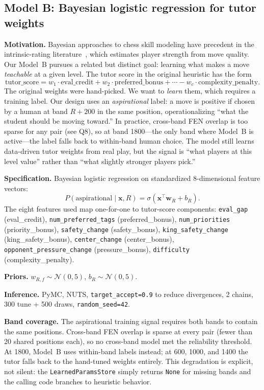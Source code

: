 \documentclass[11pt]{article}
\begin{document}
\subsection{Model B: Bayesian logistic regression for tutor weights}
\textbf{Motivation.} Bayesian approaches to chess skill modeling have precedent in the intrinsic-rating literature~\cite{regan2011intrinsic}, which estimates player strength from move quality. Our Model~B pursues a related but distinct goal: learning what makes a move \emph{teachable} at a given level. The tutor score in the original heuristic has the form
\[
\text{tutor\_score} = w_1 \cdot \text{eval\_credit} + w_2 \cdot \text{preferred\_bonus} + \cdots - w_c \cdot \text{complexity\_penalty}.
\]
The original weights were hand-picked. We want to \emph{learn} them, which requires a training label. Our design uses an \emph{aspirational} label: a move is positive if chosen by a human at band $R{+}200$ in the same position, operationalizing ``what the student should be moving toward.'' In practice, cross-band FEN overlap is too sparse for any pair (see Q8), so at band 1800---the only band where Model~B is active---the label falls back to within-band human choice. The model still learns data-driven tutor weights from real play, but the signal is ``what players at this level value'' rather than ``what slightly stronger players pick.''

\textbf{Specification.} Bayesian logistic regression on standardized 8-dimensional feature vectors:
\[
P(\text{aspirational} \mid \mathbf{x}, R) = \sigma\!\left(\mathbf{x}^{\top}\mathbf{w}_R + b_R\right).
\]
The eight features used map one-for-one to tutor-score components: \texttt{eval\_gap} (eval\_credit), \texttt{num\_preferred\_tags} (preferred\_bonus), \texttt{num\_priorities} (priority\_bonus), \texttt{safety\_change} (safety\_bonus), \texttt{king\_safety\_change} (king\_safety\_bonus), \texttt{center\_change} (center\_bonus), \texttt{opponent\_pressure\_change} (pressure\_bonus), \texttt{difficulty} (complexity\_penalty).

\textbf{Priors.} $w_{R,f} \sim \mathcal{N}(0,5)$, $b_R \sim \mathcal{N}(0,5)$.

\textbf{Inference.} PyMC, NUTS, \texttt{target\_accept=0.9} to reduce divergences, 2 chains, 300 tune + 500 draws, \texttt{random\_seed=42}.

\textbf{Band coverage.} The aspirational training signal requires both bands to contain the same positions. Cross-band FEN overlap is sparse at every pair (fewer than 20 shared positions each), so no cross-band model met the reliability threshold. At 1800, Model~B uses within-band labels instead; at 600, 1000, and 1400 the tutor falls back to the hand-tuned weights entirely. This degradation is explicit, not silent: the \texttt{LearnedParamsStore} simply returns \texttt{None} for missing bands and the calling code branches to heuristic behavior.
\end{document}
